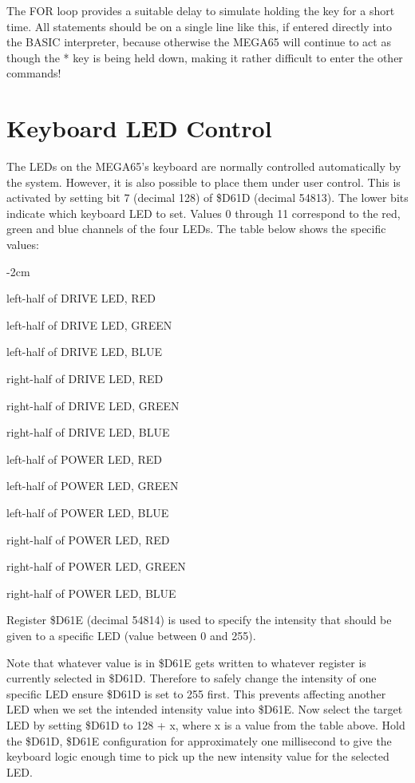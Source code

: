 The FOR loop provides a suitable delay to simulate holding the key for a short time.  All statements should be on a single line
like this, if entered directly into the BASIC interpreter, because otherwise the MEGA65 will continue to act as though the * key
is being held down, making it rather difficult to enter the other commands!

\section{Keyboard LED Control}

The LEDs on the MEGA65's keyboard are normally controlled automatically by the
system.  However, it is also possible to place them under user control.  This
is activated by setting bit 7 (decimal 128) of \$D61D (decimal 54813).  The
lower bits indicate which keyboard LED to set.  Values 0 through 11 correspond
to the red, green and blue channels of the four LEDs. The table below shows the
specific values:

\begin{adjustwidth}{}{-2cm}
\begin{description}[align=left,labelwidth=0.2cm]
\item[ 0] left-half of DRIVE LED, RED
\item[ 1] left-half of DRIVE LED, GREEN
\item[ 2] left-half of DRIVE LED, BLUE
\item[ 3] right-half of DRIVE LED, RED
\item[ 4] right-half of DRIVE LED, GREEN
\item[ 5] right-half of DRIVE LED, BLUE
\item[ 6] left-half of POWER LED, RED
\item[ 7] left-half of POWER LED, GREEN
\item[ 8] left-half of POWER LED, BLUE
\item[ 9] right-half of POWER LED, RED
\item[10] right-half of POWER LED, GREEN
\item[11] right-half of POWER LED, BLUE
\end{description}
\end{adjustwidth}

Register \$D61E (decimal 54814) is used to specify the intensity that should be
given to a specific LED (value between 0 and 255).

Note that whatever value is in \$D61E gets written to whatever register is
currently selected in \$D61D.  Therefore to safely change the intensity of one
specific LED ensure \$D61D is set to 255 first. This prevents affecting another
LED when we set the intended intensity value into \$D61E. Now select the target
LED by setting \$D61D to 128 + x, where x is a value from the table above.
Hold the \$D61D, \$D61E configuration for approximately one millisecond to give
the keyboard logic enough time to pick up the new intensity value for the
selected LED.

